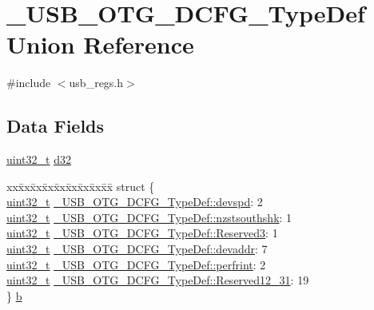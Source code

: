\hypertarget{union___u_s_b___o_t_g___d_c_f_g___type_def}{\section{\-\_\-\-U\-S\-B\-\_\-\-O\-T\-G\-\_\-\-D\-C\-F\-G\-\_\-\-Type\-Def Union Reference}
\label{union___u_s_b___o_t_g___d_c_f_g___type_def}
}


{\ttfamily \#include $<$usb\-\_\-regs.\-h$>$}

\subsection*{Data Fields}
\begin{DoxyCompactItemize}
\item 
\hyperlink{stdint_8h_a435d1572bf3f880d55459d9805097f62}{uint32\-\_\-t} \hyperlink{group___u_s_b___o_t_g___d_r_i_v_e_r_ga9fdcd91e0a212a4b3e195b67d79b033b}{d32}
\item 
\begin{tabbing}
xx\=xx\=xx\=xx\=xx\=xx\=xx\=xx\=xx\=\kill
struct \{\\
\>\hyperlink{stdint_8h_a435d1572bf3f880d55459d9805097f62}{uint32\_t} \hyperlink{group___u_s_b___o_t_g___d_r_i_v_e_r_ga478a9ce31a39e38fb2af42c4cd76916c}{\_USB\_OTG\_DCFG\_TypeDef::devspd}: 2\\
\>\hyperlink{stdint_8h_a435d1572bf3f880d55459d9805097f62}{uint32\_t} \hyperlink{group___u_s_b___o_t_g___d_r_i_v_e_r_ga7fd4cbb8c5ed0671b331e75c3b6d45ae}{\_USB\_OTG\_DCFG\_TypeDef::nzstsouthshk}: 1\\
\>\hyperlink{stdint_8h_a435d1572bf3f880d55459d9805097f62}{uint32\_t} \hyperlink{group___u_s_b___o_t_g___d_r_i_v_e_r_ga96e0a6f3a74c064c783938a70f6c1cc4}{\_USB\_OTG\_DCFG\_TypeDef::Reserved3}: 1\\
\>\hyperlink{stdint_8h_a435d1572bf3f880d55459d9805097f62}{uint32\_t} \hyperlink{group___u_s_b___o_t_g___d_r_i_v_e_r_ga480afca18ff15a505a2aacace2f86879}{\_USB\_OTG\_DCFG\_TypeDef::devaddr}: 7\\
\>\hyperlink{stdint_8h_a435d1572bf3f880d55459d9805097f62}{uint32\_t} \hyperlink{group___u_s_b___o_t_g___d_r_i_v_e_r_ga9457374dd209907da9cd87735a0db113}{\_USB\_OTG\_DCFG\_TypeDef::perfrint}: 2\\
\>\hyperlink{stdint_8h_a435d1572bf3f880d55459d9805097f62}{uint32\_t} \hyperlink{group___u_s_b___o_t_g___d_r_i_v_e_r_gad5cb5b9ebd9097c836ab8bfc22cafb09}{\_USB\_OTG\_DCFG\_TypeDef::Reserved12\_31}: 19\\
\} \hyperlink{group___u_s_b___o_t_g___d_r_i_v_e_r_gad8e6fec7364782722176e7ff197cb489}{b}\\

\end{tabbing}\end{DoxyCompactItemize}


